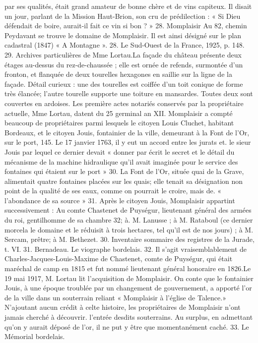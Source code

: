 par ses qualités, était grand amateur de bonne chère et de vins capiteux. Il disait un jour, parlant de la Mission Haut-Brion, son cru de prédilection : « Si Dieu défendait de boire, aurait-il fait ce vin si bon ? » 28. Momplaisir Au 82, chemin Peydavant se trouve le domaine de Momplaisir. Il est ainsi désigné sur le plan cadastral (1847) « A Montagne ». 28. Le Sud-Ouest de la France, 1925, p. 148. 29. Archives particulières de Mme Lortau.La façade du château présente deux étages au-dessus du rez-de-chaussée ; elle est ornée de refends, surmontée d'un fronton, et flanquée de deux tourelles hexagones en saillie sur la ligne de la façade. Détail curieux : une des tourelles est coiffée d'un toit conique de forme très élancée; l'autre tourelle supporte une toiture en mansardes. Toutes deux sont couvertes en ardoises. Les première actes notariés conservés par la propriétaire actuelle, Mme Lortau, datent du 25 germinal an XII. Momplaisir a compté beaucoup de propriétaires parmi lesquels le citoyen Louis Cluchet, habitant Bordeaux, et le citoyen Jouis, fontainier de la ville, demeurant à la Font de l'Or, sur le port, 145. Le 17 janvier 1763, il y eut un accord entre les jurats et. le sieur Jouis par lequel ce dernier devait « donner par écrit le secret et le détail du mécanisme de la machine hidraulique qu'il avait imaginée pour le service des fontaines qui étaient sur le port » 30. La Font de l'Or, située quai de la Grave, alimentait quatre fontaines placées sur les quais; elle tenait sa désignation non point de la qualité de ses eaux, comme on pourrait le croire, mais de. « l'abondance de sa source » 31. Après le citoyen Jouis, Momplaisir appartint successivement : Au comte Chastenet de Puységur, lieutenant général des armées du roi, gentilhomme de sa chambre 32; à. M. Lanusse ; à M. Rataboul (ce dernier morcela le domaine et le réduisit à trois hectares, tel qu'il est de nos jours) ; à M. Sercam, prêtre; à M. Bethezet. 30. Inventaire sommaire des registres de la Jurade, t. VI. 31. Bernadeau. Le viographe bordelais. 32. Il s'agit vraisemblablement de Charles-Jacques-Louis-Maxime de Chastenet, comte de Puységur, qui était maréchal de camp en 1815 et fut nommé lieutenant général honoraire en 1826.Le 19 mai 1917, M. Lortau lit l'acquisition de Momplaisir. On conte que le fontainier Jouis, à une époque troublée par un changement de gouvernement, a apporté l'or de la ville dans un souterrain reliant « Momplaisir à l'église de Talence.» N'ajoutant aucun crédit à celte histoire, les propriétaires de Momplaisir n'ont jamais cherché à découvrir. l'entrée desdits souterrains. Au surplus, en admettant qu'on y aurait déposé de l'or, il ne put y être que momentanément caché. 33. Le Mémorial bordelais.